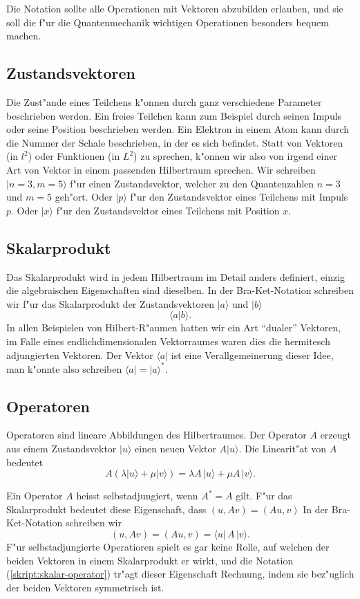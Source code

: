 Die Notation sollte alle Operationen mit Vektoren abzubilden erlauben,
und sie soll die f"ur die Quantenmechanik wichtigen Operationen besonders
bequem machen.

\subsection{Zustandsvektoren}
Die Zust"ande eines Teilchens k"onnen durch ganz verschiedene Parameter
beschrieben werden. Ein freies Teilchen kann zum Beispiel durch seinen
Impuls oder seine Position beschrieben werden. Ein Elektron in einem
Atom kann durch die Nummer der Schale beschrieben, in der es sich befindet. 
Statt von Vektoren (in $l^2$) oder Funktionen (in $L^2$) zu sprechen, k"onnen
wir also von irgend einer Art von Vektor in einem passenden Hilbertraum 
sprechen. Wir schreiben 
$|n=3,m=5\rangle$ f"ur einen Zustandsvektor, welcher zu den Quantenzahlen $n=3$ und $m=5$ geh"ort. Oder $|p\rangle$ f"ur den Zustandsvektor eines Teilchens
mit Impuls $p$. Oder $|x\rangle$ f"ur den Zustandsvektor eines Teilchens
mit Position $x$.

\subsection{Skalarprodukt}
Das Skalarprodukt wird in jedem Hilbertraum im Detail anders definiert,
einzig die algebraischen Eigenschaften sind dieselben. In der Bra-Ket-Notation
schreiben wir  f"ur das Skalarprodukt der Zustandsvektoren 
$|a\rangle$ und $|b\rangle$
\[
\langle a|b\rangle.
\]
In allen Beispielen von Hilbert-R"aumen hatten wir ein Art ``dualer''
Vektoren, im Falle eines endlichdimensionalen Vektorraumes waren dies
die hermitesch adjungierten Vektoren. Der Vektor $\langle a|$ ist eine
Verallgemeinerung dieser Idee, man k"onnte also schreiben
$\langle a|=|a\rangle^*$.

\subsection{Operatoren}
Operatoren sind lineare Abbildungen des Hilbertraumes. Der Operator $A$
erzeugt aus einem Zustandsvektor $|u\rangle$ einen neuen Vektor
$A|u\rangle$. Die Linearit"at von $A$ bedeutet
\[
A(\lambda |u\rangle + \mu |v\rangle)=\lambda A \,|u\rangle + \mu A\,|v\rangle.
\]

Ein Operator $A$ heisst selbstadjungiert, wenn $A^*=A$ gilt.
F"ur das Skalarprodukt bedeutet diese Eigenschaft, dass $(u, Av)=(Au,v)$ 
In der Bra-Ket-Notation schreiben wir 
\begin{equation}
(u,Av)=(Au,v)=\langle u|\,A\,|v\rangle.
\label{skript:skalar-operator}
\end{equation}
F"ur selbstadjungierte Operatioren spielt es gar keine Rolle, auf welchen
der beiden Vektoren in einem Skalarprodukt er wirkt, und die Notation
(\ref{skript:skalar-operator}) tr"agt dieser Eigenschaft Rechnung, indem sie
bez"uglich der beiden Vektoren symmetrisch ist.

